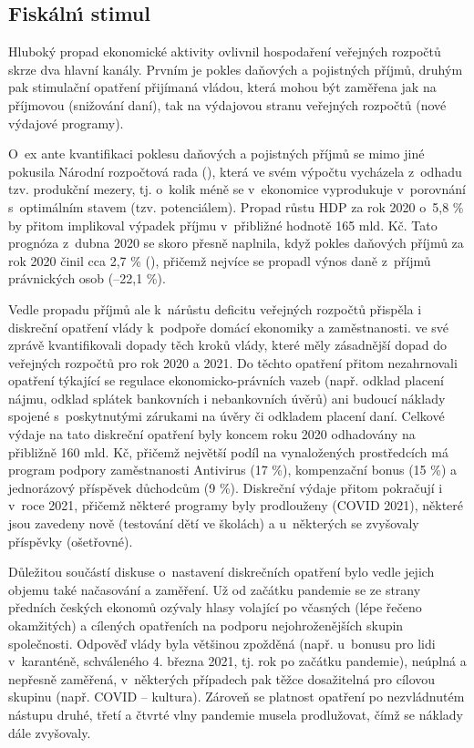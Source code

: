 \subsection*{Fisk\'{a}ln\'{\i} stimul} 
Hluboký propad ekonomické aktivity ovlivnil hospodaření veřejných rozpočtů skrze dva hlavní kanály. Prvním je pokles daňových a pojistných příjmů, druhým pak stimulační opatření přijímaná vládou, která mohou být zaměřena jak na příjmovou (snižování daní), tak na výdajovou stranu veřejných rozpočtů (nové výdajové programy). 

O~ex ante kvantifikaci poklesu daňových a pojistných příjmů se mimo jiné pokusila Národní rozpočtová rada (\cite{Hlavacek2020}), která ve svém výpočtu vycházela z~odhadu tzv. produkční mezery, tj. o~kolik méně se v~ekonomice vyprodukuje v~porovnání s~optimálním stavem (tzv. potenciálem). Propad růstu HDP za rok 2020 o~5,8 \% by přitom implikoval výpadek příjmu v~přibližné hodnotě 165 mld. Kč. Tato prognóza z~dubna 2020 se skoro přesně naplnila, když pokles daňových příjmů za rok 2020 činil cca 2,7 \% (\cite{MFCR2021}), přičemž nejvíce se propadl výnos daně z~příjmů právnických osob (--22,1 \%).

Vedle propadu příjmů ale k~nárůstu deficitu veřejných rozpočtů přispěla i diskreční opatření vlády k~podpoře domácí ekonomiky a zaměstnanosti. \cite{Hlavacek2020} ve své zprávě kvantifikovali dopady těch kroků vlády, které měly zásadnější dopad do veřejných rozpočtů pro rok 2020 a 2021. Do těchto opatření přitom nezahrnovali opatření týkající se regulace ekonomicko-právních vazeb (např. odklad placení nájmu, odklad splátek bankovních i nebankovních úvěrů) ani budoucí náklady spojené s~poskytnutými zárukami na úvěry či odkladem placení daní. Celkové výdaje na tato diskreční opatření byly koncem roku 2020 odhadovány na přibližně 160 mld. Kč, přičemž největší podíl na vynaložených prostředcích má program podpory zaměstnanosti Antivirus (17 \%), kompenzační bonus (15 \%) a jednorázový příspěvek důchodcům (9 \%). Diskreční výdaje přitom pokračují i v~roce 2021, přičemž některé programy byly prodlouženy (COVID 2021), některé jsou zavedeny nově (testování dětí ve školách) a u~některých se zvyšovaly příspěvky (ošetřovné).

Důležitou součástí diskuse o~nastavení diskrečních opatření bylo vedle jejich objemu také načasování a zaměření. Už od začátku pandemie se ze strany předních českých ekonomů ozývaly hlasy volající po včasných (lépe řečeno okamžitých) a cílených opatřeních na podporu nejohroženějších skupin spo\-le\-čno\-sti. Odpověď vlády byla většinou zpožděná (např. u~bonusu pro lidi v~karanténě, schváleného 4. března 2021, tj. rok po začátku pandemie), neúplná a nepřesně zaměřená, v~některých případech pak těžce dosažitelná pro cílovou skupinu (např. COVID – kultura). Zároveň se platnost opatření po nezvládnutém nástupu druhé, třetí a čtvrté vlny pandemie musela prodlužovat, čímž se náklady dále zvyšovaly.

